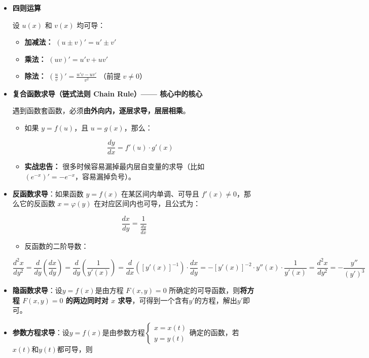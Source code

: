 \documentclass[
]{article}
\begin{document}
\begin{itemize}
\item
  \textbf{四则运算}

  设 \(u(x)\) 和 \(v(x)\) 均可导：

  \begin{itemize}
  \item
    \textbf{加减法：} \((u \pm v)' = u' \pm v'\)
  \item
    \textbf{乘法：} \((uv)' = u'v + uv'\)
  \item
    \textbf{除法：}
    \(\left(\frac{u}{v}\right)' = \frac{u'v - uv'}{v^2}\) （前提
    \(v \neq 0\)）
  \end{itemize}
\item
  \textbf{复合函数求导（链式法则 Chain Rule）------ 核心中的核心}

  遇到函数套函数，必须\textbf{由外向内，逐层求导，层层相乘}。

  \begin{itemize}
  \item
    如果 \(y = f(u)\)，且 \(u = g(x)\)，那么：

    \[\frac{dy}{dx} = f'(u) \cdot g'(x)\]
  \item
    \textbf{实战忠告：} 很多时候容易漏掉最内层自变量的求导（比如
    \((e^{-x})' = -e^{-x}\)，容易漏掉负号）。
  \end{itemize}
\item
  \textbf{反函数求导}：如果函数 \(y = f(x)\) 在某区间内单调、可导且
  \(f'(x) \neq 0\)，那么它的反函数 \(x = \varphi(y)\)
  在对应区间内也可导，且公式为：

  \[\frac{dx}{dy} = \frac{1}{\frac{dy}{dx}}\]

  \begin{itemize}
  \item
    反函数的二阶导数：
  \end{itemize}

  \[\frac{d^2x}{dy^2} = \frac{d}{dy}\left( \frac{dx}{dy} \right) = \frac{d}{dy}\left( \frac{1}{y'(x)} \right)= \frac{d}{dx}\left( [y'(x)]^{-1} \right) \cdot \frac{dx}{dy}= -[y'(x)]^{-2} \cdot y''(x) \cdot \frac{1}{y'(x)}=\frac{d^2x}{dy^2} = -\frac{y''}{(y')^3}\]
\item
  \textbf{隐函数求导}：设\(y=f(x)\)是由方程 \(F(x,y)=0\)
  所确定的可导函数，则\textbf{将方程 \(F(x,y) = 0\) 的两边同时对 \(x\)
  求导}，可得到一个含有\(y'\)的方程，解出\(y'\)即可。
\item
  \textbf{参数方程求导}：设\(y=f(x)\)是由参数方程\(\begin{cases} x = x(t) \\ y = y(t) \end{cases}\)确定的函数，若\(x(t)\)和\(y(t)\)都可导，则
\end{itemize}
\end{document}
